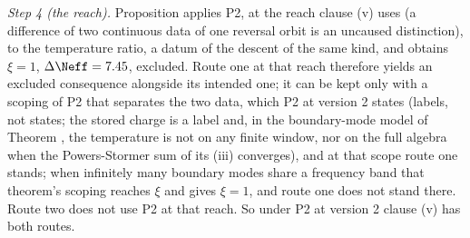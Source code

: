 \emph{Step 4 (the reach).} Proposition  applies P2, at the reach clause (v) uses (a difference of two continuous data of one reversal orbit is an uncaused distinction), to the temperature ratio, a datum of the descent of the same kind, and obtains $\xi = 1$, $\Delta\Neff = 7.45$, excluded. Route one at that reach therefore yields an excluded consequence alongside its intended one; it can be kept only with a scoping of P2 that separates the two data, which P2 at version 2 states (labels, not states; the stored charge is a label and, in the boundary-mode model of Theorem , the temperature is not on any finite window, nor on the full algebra when the Powers-Stormer sum of its (iii) converges), and at that scope route one stands; when infinitely many boundary modes share a frequency band that theorem's scoping reaches $\xi$ and gives $\xi = 1$, and route one does not stand there. Route two does not use P2 at that reach. So under P2 at version 2 clause (v) has both routes.
